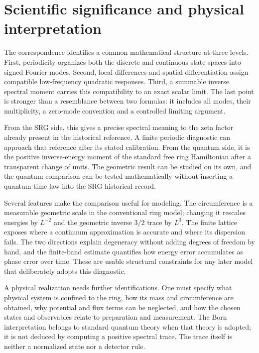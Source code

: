 \documentclass[11pt,a4paper]{article}
\theoremstyle{definition}\newtheorem{definition}[theorem]{Definition}
\theoremstyle{remark}\newtheorem{remark}[theorem]{Remark}
\numberwithin{equation}{section}
\begin{document}
\section{Scientific significance and physical interpretation}\label{sec:discussion}
The correspondence identifies a common mathematical structure at three
levels. First, periodicity organizes both the discrete and continuous
state spaces into signed Fourier modes. Second, local differences and
spatial differentiation assign compatible low-frequency quadratic
responses. Third, a summable inverse spectral moment carries this
compatibility to an exact scalar limit. The last point is stronger than
a resemblance between two formulas: it includes all modes, their
multiplicity, a zero-mode convention and a controlled limiting argument.

From the SRG side, this gives a precise spectral meaning to the zeta
factor already present in the historical reference. A finite periodic
diagnostic can approach that reference after its stated calibration.
From the quantum side, it is the positive inverse-energy moment of the
standard free ring Hamiltonian after a transparent change of units.
The geometric result can be studied on its own, and the quantum
comparison can be tested mathematically without inserting a quantum
time law into the SRG historical record.

Several features make the comparison useful for modeling. The circumference
is a measurable geometric scale in the conventional ring model; changing it
rescales energies by \(L^{-2}\) and the geometric inverse \(3/2\) trace
by \(L^3\). The finite lattice exposes where a continuum approximation
is accurate and where its dispersion fails. The two directions explain
degeneracy without adding degrees of freedom by hand, and the
finite-band estimate quantifies how energy error accumulates as phase
error over time. These are usable structural constraints for any later
model that deliberately adopts this diagnostic.

A physical realization needs further identifications. One must specify
what physical system is confined to the ring, how its mass and
circumference are obtained, why potential and flux terms can be
neglected, and how the chosen states and observables relate to
preparation and measurement. The Born interpretation belongs to
standard quantum theory when that theory is adopted; it is not
deduced by computing a positive spectral trace.
The trace itself is neither a normalized state nor a detector rule.
\end{document}
